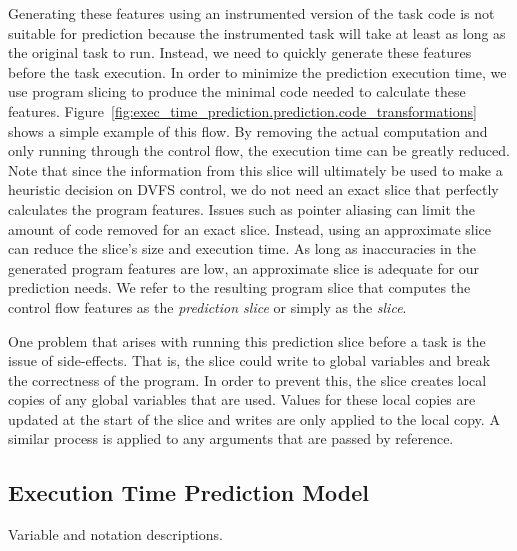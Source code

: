 Generating these features using an instrumented version of the task code is not
suitable for prediction because the instrumented task will take at least as
long as the original task to run. Instead, we need to quickly generate these
features before the task execution. In order to minimize the prediction
execution time, we use program slicing \cite{tip-jpl95} to produce the minimal
code needed to calculate these features.
Figure~\ref{fig:exec_time_prediction.prediction.code_transformations} shows a
simple example of this flow. By removing the actual computation and only
running through the control flow, the execution time can be greatly reduced. 
Note that since the information from this slice will ultimately be used to make a
heuristic decision on DVFS control, we do not need an exact slice
that perfectly calculates the program features. Issues such as pointer aliasing
can limit the amount of code removed for an exact slice.  Instead, using an
approximate slice can reduce the slice's size and execution time. As long as
inaccuracies in the generated program features are low, an approximate slice is
adequate for our prediction needs.
We refer to the resulting program slice that computes the control flow features
as the \emph{prediction slice} or simply as the \emph{slice}.

One problem that arises with running this prediction slice before a task is the
issue of side-effects. That is, the slice could write to global variables and
break the correctness of the program. In order to prevent this, the slice
creates local copies of any global variables that are used. Values for these
local copies are updated at the start of the slice and writes are only applied
to the local copy. A similar process is applied to any arguments that are
passed by reference.

\subsection{Execution Time Prediction Model}
\label{sec:exec_time_prediction.prediction.model}

\begin{table}[tb]
  \begin{center}
    \begin{small}
    
    \end{small}
    \caption{Variable and notation descriptions.}
    \label{tab:exec_time_prediction.prediction.variables}
  \end{center}
\end{table}

